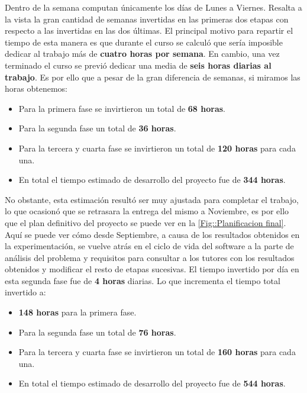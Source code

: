     \medskip

    \noindent Dentro de la semana computan únicamente los días de Lunes a Viernes. Resalta a la vista la gran cantidad de semanas invertidas en las primeras dos etapas con respecto a las invertidas en las dos últimas. El principal motivo para repartir el tiempo de esta manera es que durante el curso se calculó que sería imposible dedicar al trabajo más de \textbf{cuatro horas por semana}. En cambio, una vez terminado el curso se previó dedicar una media de \textbf{seis horas diarias al trabajo}. Es por ello que a pesar de la gran diferencia de semanas, si miramos las horas obtenemos:
    
    \begin{itemize}
        \item Para la primera fase se invirtieron un total de \textbf{68 horas}.
        \item Para la segunda fase un total de \textbf{36 horas}.
        \item Para la tercera y cuarta fase se invirtieron un total de \textbf{120 horas} para cada una.
        \item En total el tiempo estimado de desarrollo del proyecto fue de \textbf{344 horas}.
    \end{itemize}
        
    \noindent No obstante, esta estimación resultó ser muy ajustada para completar el trabajo, lo que ocasionó que se retrasara la entrega del mismo a Noviembre, es por ello que el plan definitivo del proyecto se puede ver en la \autoref{Fig::Planificacion final}. Aquí se puede ver cómo desde Septiembre, a causa de los resultados obtenidos en la experimentación, se vuelve atrás en el ciclo de vida del software a la parte de análisis del problema y requisitos para consultar a los tutores con los resultados obtenidos y modificar el resto de etapas sucesivas. El tiempo invertido por día en esta segunda fase fue de \textbf{4 horas} diarias. Lo que incrementa el tiempo total invertido a:

    \begin{itemize}
        \item \textbf{148 horas} para la primera fase.
        \item Para la segunda fase un total de \textbf{76 horas}.
        \item Para la tercera y cuarta fase se invirtieron un total de \textbf{160 horas} para cada una.
        \item En total el tiempo estimado de desarrollo del proyecto fue de \textbf{544 horas}.
    \end{itemize}

